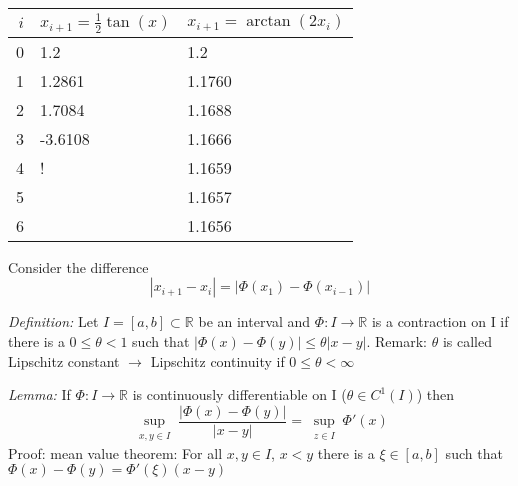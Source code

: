 \begin{center}
    \begin{tabular}{r l l }
        \toprule
        $i$ & $x_{i+1}=\frac{1}{2}\tan(x)$ & $x_{i+1}=\arctan(2x_i)$ \\
        \midrule
        0   & 1.2                          & 1.2                     \\
        1   & 1.2861                       & 1.1760                  \\
        2   & 1.7084                       & 1.1688                  \\
        3   & -3.6108                      & 1.1666                  \\
        4   & {}!                          & 1.1659                  \\
        5   &                              & 1.1657                  \\
        6   &                              & 1.1656                  \\
        \bottomrule
    \end{tabular}
\end{center}
Consider the difference
\begin{equation*}
    |x_{i+1}-x_i| = |\Phi(x_1)-\Phi(x_{i-1})|
\end{equation*}

\emph{Definition:} Let $I=[a,b] \subset \mathbb{R}$ be an interval and $\Phi: I \to \mathbb{R}$ is a contraction on I if there is a $0 \leq \theta < 1$
such that $|\Phi(x)-\Phi(y)| \leq \theta |x-y|$. Remark: $\theta$ is called Lipschitz constant $\to$ Lipschitz continuity if $0 \leq \theta < \infty$

\vspace{5mm}

\emph{Lemma:} If $\Phi: I \to  \mathbb{R}$ is continuously differentiable on I ($\theta \in C^1(I)$) then
\begin{equation*}
    \sup_{\substack{x,y \in I}} \frac{|\Phi(x)-\Phi(y)|}{|x-y|} = \sup_{\substack{z \in I}} \Phi'(x)
\end{equation*}
Proof: mean value theorem: For all $x,y \in I$, $x<y$ there is a $\xi \in [a,b]$ such that\\
$\Phi(x)-\Phi(y) = \Phi'(\xi)(x-y)$

\vspace{5mm}

